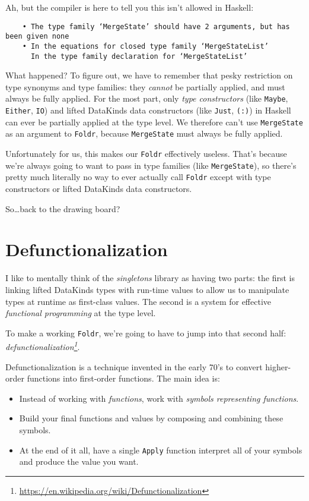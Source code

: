 \documentclass[]{article}
\renewcommand{\href}[2]{#2\footnote{\url{#1}}}
\begin{document}
Ah, but the compiler is here to tell you this isn't allowed in Haskell:

\begin{verbatim}
    • The type family ‘MergeState’ should have 2 arguments, but has been given none
    • In the equations for closed type family ‘MergeStateList’
      In the type family declaration for ‘MergeStateList’
\end{verbatim}

What happened? To figure out, we have to remember that pesky restriction on type
synonyms and type families: they \emph{cannot} be partially applied, and must
always be fully applied. For the most part, only \emph{type constructors} (like
\texttt{Maybe}, \texttt{Either}, \texttt{IO}) and lifted DataKinds data
constructors (like \texttt{\textquotesingle{}Just},
\texttt{\textquotesingle{}(:)}) in Haskell can ever be partially applied at the
type level. We therefore can't use \texttt{MergeState} as an argument to
\texttt{Foldr}, because \texttt{MergeState} must always be fully applied.

Unfortunately for us, this makes our \texttt{Foldr} effectively useless. That's
because we're always going to want to pass in type families (like
\texttt{MergeState}), so there's pretty much literally no way to ever actually
call \texttt{Foldr} except with type constructors or lifted DataKinds data
constructors.

So\ldots{}back to the drawing board?

\hypertarget{defunctionalization}{%
\section{Defunctionalization}\label{defunctionalization}}

I like to mentally think of the \emph{singletons} library as having two parts:
the first is linking lifted DataKinds types with run-time values to allow us to
manipulate types at runtime as first-class values. The second is a system for
effective \emph{functional programming} at the type level.

To make a working \texttt{Foldr}, we're going to have to jump into that second
half:
\emph{\href{https://en.wikipedia.org/wiki/Defunctionalization}{defunctionalization}}.

Defunctionalization is a technique invented in the early 70's to convert
higher-order functions into first-order functions. The main idea is:

\begin{itemize}
\tightlist
\item
  Instead of working with \emph{functions}, work with \emph{symbols representing
  functions}.
\item
  Build your final functions and values by composing and combining these
  symbols.
\item
  At the end of it all, have a single \texttt{Apply} function interpret all of
  your symbols and produce the value you want.
\end{itemize}
\end{document}
